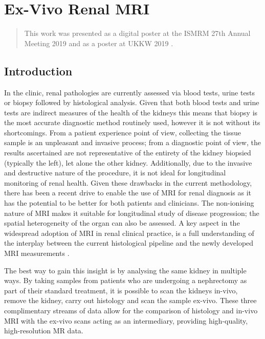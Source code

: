 \chapter{Ex-Vivo Renal MRI}
\label{chap:Neph}
\newpage
\begin{abstract}
	This work was presented as a digital poster at the \ac{ISMRM} 27th Annual Meeting 2019 \cite{daniel_effects_2019} and as a poster at \ac{UKKW} 2019 \cite{kazmi_determining_2019}.
	
	\lipsum[1]
\end{abstract}
\newpage

\section{Introduction}

In the clinic, renal pathologies are currently assessed via blood tests, urine tests or biopsy followed by histological analysis. Given that both blood tests and urine tests are indirect measures of the health of the kidneys this means that biopsy is the most accurate diagnostic method routinely used, however it is not without its shortcomings. From a patient experience point of view, collecting the tissue sample is an unpleasant and invasive process; from a diagnostic point of view, the results ascertained are not representative of the entirety of the kidney biopsied (typically the left), let alone the other kidney. Additionally, due to the invasive and destructive nature of the procedure, it is not ideal for longitudinal monitoring of renal health. Given these drawbacks in the current methodology, there has been a recent drive to enable the use of \ac{MRI} for renal diagnosis as it has the potential to be better for both patients and clinicians. The non-ionising nature of \ac{MRI} makes it suitable for longitudinal study of disease progression; the spatial heterogeneity of the organ can also be assessed. A key aspect in the widespread adoption of \ac{MRI} in renal clinical practice, is a full understanding of the interplay between the current histological pipeline and the newly developed \ac{MRI} measurements \cite{simms_recent_2020}.

The best way to gain this insight is by analysing the same kidney in multiple ways. By taking samples from patients who are undergoing a nephrectomy as part of their standard treatment, it is possible to scan the kidneys in-vivo, remove the kidney, carry out histology and scan the sample ex-vivo. These three complimentary streams of data allow for the comparison of histology and in-vivo \ac{MRI} with the ex-vivo scans acting as an intermediary, providing high-quality, high-resolution MR data.


